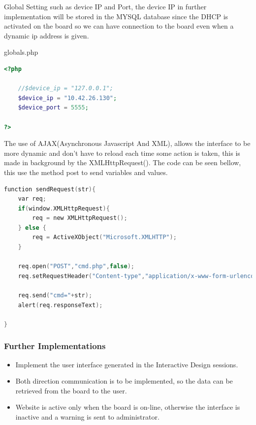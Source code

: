 Global Setting such as device IP and Port, the device IP in further implementation will be stored in the MYSQL database since the DHCP is activated on the board so we can have connection to the board even when a dynamic ip address is given.

globals.php

\begin{lstlisting}[language=php]
<?php
	
	//$device_ip = "127.0.0.1";
	$device_ip = "10.42.26.130";
	$device_port = 5555;
	
?>
\end{lstlisting}

The use of AJAX(Asynchronous Javascript And XML), allows the interface to be more dynamic and don't have to reload each time some action is taken, this is made in background by the XMLHttpRequest(). The code can be seen bellow, this use the method post to send variables and values.

\begin{lstlisting}[language=c]
function sendRequest(str){
	var req;
	if(window.XMLHttpRequest){
		req	= new XMLHttpRequest();
	} else {
		req = ActiveXObject("Microsoft.XMLHTTP");	
	}

	req.open("POST","cmd.php",false);
	req.setRequestHeader("Content-type","application/x-www-form-urlencoded");
	
	req.send("cmd="+str);
	alert(req.responseText);

}
\end{lstlisting}

\subsubsection{Further Implementations}
\begin{itemize}
	\item Implement the user interface generated in the Interactive Design sessions.
	\item Both direction communication is to be implemented, so the data can be retrieved from the board to the user.
	\item Website is active only when the board is on-line, otherwise the interface is inactive and a warning is sent to administrator.
\end{itemize}

